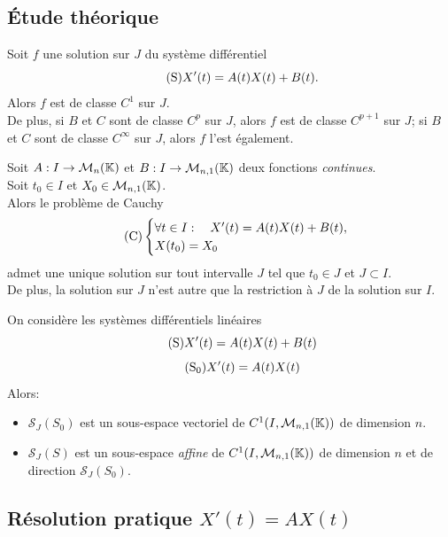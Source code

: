 \documentclass{book}
\begin{document}
\subsection{Étude théorique}
\begin{Proposition}
Soit $f$ une solution sur $J$ du système différentiel
\[\tag{$\mathrm{S}$} X'(t) = A(t) X(t) + B(t).\]
Alors $f$ est de classe $C^1$ sur $J$.\\
De plus, si $B$ et $C$ sont de classe $C^ p$ sur $J$,
alors $f$ est de classe $C^{p+1}$ sur $J$;
si $B$ et $C$ sont de classe $C^{\infty}$ sur $J$, alors $f$ l'est également.
\end{Proposition}
\begin{Theoreme}
Soit $A:I\to\mathcal{M}_{n}(\mathbb{K})$ et $B:I\to \mathcal{M}_{n,1}(\mathbb{K})$ deux fonctions \emph{continues}.\\
Soit $t_0\in I$ et $X_0\in \mathcal{M}_{n,1}(\mathbb{K})$.\\
Alors le problème de Cauchy
\[\tag{$\mathrm{C}$} \begin{cases}
    \forall t\in I:\quad X'(t) = A(t) X(t) + B(t), \\
    X(t_0) = X_0
\end{cases}\]
admet une unique solution sur tout intervalle $J$ tel que $t_0\in J$ et $J\subset I$.\\
De plus, la solution sur $J$ n'est autre que la restriction à $J$
de la solution sur $I$.
\end{Theoreme}
%
%
\begin{Theoreme}[Structure]
On considère les systèmes différentiels linéaires
\[\tag{$\mathrm{S}$}   X'(t) = A(t)X(t) + B(t)\]
\[\tag{$\mathrm{S_0}$} X'(t) = A(t)X(t)\]
Alors:
\begin{itemize}
\item $\mathcal{S}_J(S_0)$ est un sous-espace vectoriel de $C^1(I,\mathcal{M}_{n,1}(\mathbb{K}))$ de dimension $n$.
\item $\mathcal{S}_J(S)$ est un sous-espace \emph{affine} de $C^1(I,\mathcal{M}_{n,1}(\mathbb{K}))$ de dimension $n$ et de direction $\mathcal{S}_J(S_0)$.
\end{itemize}
\end{Theoreme}
\subsection{Résolution pratique $X'(t)=AX(t)$}
\end{document}

